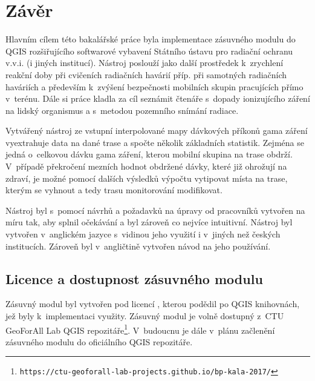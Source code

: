 \chapter{Závěr}
\label{5-zaver}

Hlavním cílem této bakalářské práce byla implementace zásuvného modulu
do QGIS rozšiřujícího softwarové vybavení Státního ústavu pro radiační
ochranu v.v.i. (i jiných institucí). Nástroj poslouží jako další
prostředek k~zrychlení reakční doby při cvičeních radiačních havárií
příp. při samotných radiačních haváriích a především k~zvýšení
bezpečnosti mobilních skupin pracujících přímo v~terénu. Dále si práce
kladla za cíl seznámit čtenáře s~dopady ionizujícího záření na lidský
organismus a s~metodou pozemního snímání radiace.

Vytvářený nástroj ze vstupní interpolované mapy dávkových příkonů gama
záření vyextrahuje data na dané trase a spočte několik základních
statistik. Zejména se jedná o~celkovou dávku gama záření, kterou
mobilní skupina na trase obdrží. V~případě překročení mezních hodnot
obdržené dávky, které již ohrožují na zdraví, je možné pomocí dalších
výsledků výpočtu vytipovat místa na trase, kterým se vyhnout a tedy
trasu monitorování modifikovat.

Nástroj byl s~pomocí návrhů a požadavků na úpravy od pracovníků
 vytvořen na míru tak, aby splnil očekávání a byl zároveň co
nejvíce intuitivní. Nástroj byl vytvořen v~anglickém jazyce s~vidinou
jeho využití i v~jiných než českých institucích. Zároveň byl
v~angličtině vytvořen návod na jeho používání.


\section{Licence a dostupnost zásuvného modulu} Zásuvný modul byl
vytvořen pod licencí , kterou podědil po QGIS knihovnách,
jež byly k~implementaci využity. Zásuvný modul je volně dostupný z~CTU
GeoForAll Lab QGIS
repozitáře\footnote{\texttt{https://ctu-geoforall-lab-projects.github.io/bp-kala-2017/}}. V~budoucnu
je dále v~plánu začlenění zásuvného modulu do oficiálního QGIS
repozitáře.

 



